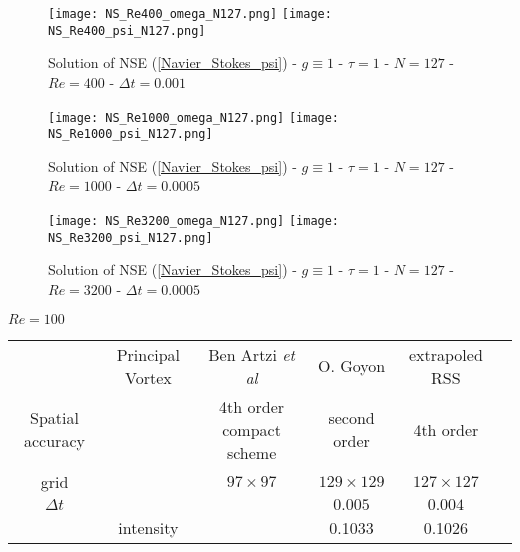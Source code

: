 {\begin{figure}[!ht]
\begin{center}
\texttt{[image: NS\_Re400\_omega\_N127.png]}
\texttt{[image: NS\_Re400\_psi\_N127.png]}\\
\caption{Solution of NSE  (\ref{Navier_Stokes_psi}) - $g \equiv 1$ - $\tau = 1$ -  $N=127$ - $Re = 400$ - $\Delta t = 0.001$}
\label{NS_Re400}
\end{center}
\end{figure}

\begin{figure}[!ht]
\begin{center}
\texttt{[image: NS\_Re1000\_omega\_N127.png]}
\texttt{[image: NS\_Re1000\_psi\_N127.png]}\\
\caption{Solution of NSE (\ref{Navier_Stokes_psi}) - $g \equiv 1$ - $\tau = 1$ -  $N=127$ - $Re = 1000$ - $\Delta t = 0.0005$}
\label{NS_Re1000}
\end{center}
\end{figure}

\begin{figure}[!ht]
\begin{center}
\texttt{[image: NS\_Re3200\_omega\_N127.png]}
\texttt{[image: NS\_Re3200\_psi\_N127.png]}\\
\caption{Solution of NSE (\ref{Navier_Stokes_psi}) - $g \equiv 1$ - $\tau = 1$ -  $N=127$ - $Re = 3200$ - $\Delta t = 0.0005$}
\label{NS_Re3200}
\end{center}
\end{figure}
\begin{table}[!ht]
\begin{center}

\vspace{0.5cm}

$Re=100$


\begin{tabular}{| c|c|c|c|c|c | }
\hline 
 & Principal Vortex  & Ben Artzi {\it et al} \cite{BenArtziCroisille} & O. Goyon \cite{Goyon} & extrapoled RSS \\ 
Spatial accuracy &                  & 4th order compact scheme                        & second order      &   4th order          \\
\hline 
grid &   & $97 \times 97$ & $ 129 \times 129$ & $127 \times 127$ \\ 
\hline
$\Delta t$ & & &$0.005$ & $0.004$\\
\hline
&  intensity &     & 0.1033 & 0.1026 \\ 
 

\end{tabular}
\end{center}
\end{table}}
